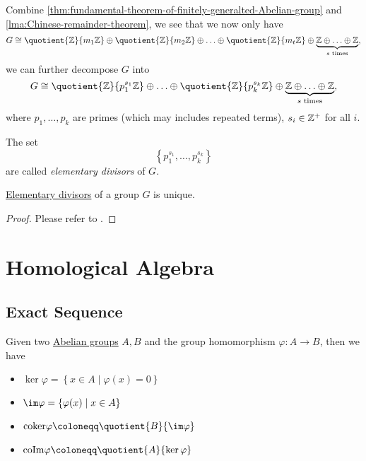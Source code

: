 Combine \autoref{thm:fundamental-theorem-of-finitely-generalted-Abelian-group} and \autoref{lma:Chinese-remainder-theorem}, we see that we now only have
\[
	G\cong \quotient{\mathbb{\MakeUppercase{z}} }{m_1 \mathbb{\MakeUppercase{z}} } \oplus \quotient{\mathbb{\MakeUppercase{z}} }{m_2 \mathbb{\MakeUppercase{z}} } \oplus \ldots \oplus \quotient{\mathbb{\MakeUppercase{z}} }{m_t \mathbb{\MakeUppercase{z}} }  \oplus \underbrace{\mathbb{\MakeUppercase{z}} \oplus \ldots \oplus \mathbb{\MakeUppercase{z}}  }_{s \text{ times}},
\]
we can further decompose \(G\) into
\[
	G\cong \quotient{\mathbb{\MakeUppercase{z}} }{p_1^{s_1}\mathbb{\MakeUppercase{z}} }\oplus \ldots \oplus \quotient{\mathbb{\MakeUppercase{z}} }{p_k^{s_k}\mathbb{\MakeUppercase{z}} }   \oplus \underbrace{\mathbb{\MakeUppercase{z}} \oplus \ldots \oplus \mathbb{\MakeUppercase{z}}  }_{s \text{ times}},
\]
where \(p_1, \ldots , p_{k}  \) are primes (which may includes repeated terms), \(s_{i} \in \mathbb{\MakeUppercase{z}} ^+\) for all \(i\).

\begin{definition}\label{def:elementary-divisors}
	The set
	\[
		\left\{p_1^{s_1}, \ldots , p_{k}^{s_k} \right\}
	\]
	are called \emph{elementary divisors} of \(G\).
\end{definition}

\begin{theorem}\label{thm:uniqueness-of-elementary-divisors}
	\hyperref[def:elementary-divisors]{Elementary divisors} of a group \(G\) is unique.
\end{theorem}
\begin{proof}
	Please refer to \cite{armstrong2013basic}.
\end{proof}

\chapter{Homological Algebra}\label{sec:homological-algebra}
\section{Exact Sequence}
\begin{prev}
	Given two \hyperref[def:Abelian-group]{Abelian groups} \(A, B\) and the group homomorphism \(\varphi\colon A\to B\), then we have
	\begin{itemize}
		\item \(\ker  \varphi = \left\{x\in A\mid \varphi (x) = 0\right\}\)
		\item \(\im  \varphi = \left\{\varphi (x)\mid x\in A\right\} \)
		\item \(\mathrm{coker}\varphi \coloneqq \quotient{B}{\im  \varphi}\)
		\item \(\mathrm{coIm} \varphi \coloneqq \quotient{A}{\ker  \varphi}\)
	\end{itemize}
\end{prev}

